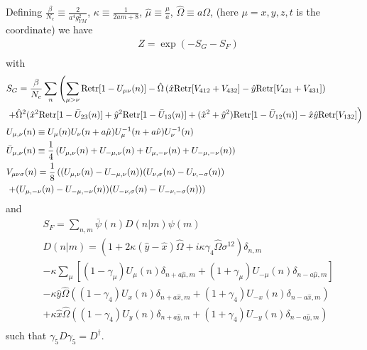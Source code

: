 Defining $\frac{\beta}{N_c} \equiv \frac{2}{a^4g_{YM}^2}$, $\kappa \equiv \frac{1}{2am+8}$, $\hat{\mu}\equiv \frac{\mu}{a}$, $\hat{\Omega}\equiv a\Omega$, (here $\mu=x,y,z,t$ is the coordinate) we have
\begin{equation}
\begin{split}
&Z=\exp (-S_G-S_F)\\
\end{split}
\end{equation}
with
\textcolor[rgb]{0,0,0.8}{
\begin{equation}
\begin{split}
&S_G=\frac{\beta}{N_c}\sum _{n}\left(\sum _{\mu >\nu}{\rm Retr}[1-U_{\mu\nu}(n)]-\hat{\Omega}\left(\hat{x}{\rm Retr}[V_{412}+V_{432}]-\hat{y}{\rm Retr}[V_{421}+V_{431}]\right)\right.\\
&\left.+\hat{\Omega}^2(\hat{x}^2{\rm Retr}[1-\bar{U}_{23}(n)]+\hat{y}^2{\rm Retr}[1-\bar{U}_{13}(n)]+(\hat{x}^2+\hat{y}^2){\rm Retr}[1-\bar{U}_{12}(n)]-\hat{x}\hat{y}{\rm Retr}[V_{132}]\right)\\
&U_{\mu, \nu}(n)\equiv U_{\mu}(n)U_{\nu}(n+a\hat{\mu})U^{-1}_{\mu}(n+a\hat{\nu})U^{-1}_{\nu}(n)\\
&\bar{U}_{\mu, \nu}(n)\equiv \frac{1}{4}\left(U_{\mu, \nu}(n)+U_{-\mu ,\nu}(n)+U_{\mu, -\nu}(n)+U_{-\mu, -\nu}(n)\right)\\
&V_{\mu\nu\sigma}(n)=\frac{1}{8}\left((U_{\mu,\nu}(n)-U_{-\mu,\nu}(n))(U_{\nu,\sigma}(n)-U_{\nu,-\sigma}(n))\right.\\
&\left.+(U_{\mu,-\nu}(n)-U_{-\mu,-\nu}(n))(U_{-\nu,\sigma}(n)-U_{-\nu,-\sigma}(n))\right)\\
\end{split}
\end{equation}
}
and
\textcolor[rgb]{0,0,0.8}{
\begin{equation}
\begin{split}
&S_F=\sum _{n,m}\bar{\psi }(n) D(n|m) \psi(m)\\
&D(n|m)=\left(1+2\kappa(\hat{y}-\hat{x})\hat{\Omega}+i\kappa \gamma _4 \hat{\Omega} \sigma ^{12}\right)\delta _{n,m}\\
&-\kappa\sum _{\mu}\left[(1-\gamma _{\mu})U_{\mu}(n)\delta _{n+a\hat{\mu},m}+(1+\gamma _{\mu})U_{-\mu}(n)\delta _{n-a\hat{\mu},m}\right]\\
&-\kappa \hat{y}\hat{\Omega} \left((1-\gamma _4)U_{x}(n)\delta _{n+a\hat{x},m}+(1+\gamma _4)U_{-x}(n)\delta _{n-a\hat{x},m}\right)\\
&+\kappa \hat{x}\hat{\Omega} \left((1-\gamma _4)U_{y}(n)\delta _{n+a\hat{y},m}+(1+\gamma _4)U_{-y}(n)\delta _{n-a\hat{y},m}\right)\\
\end{split}
\end{equation}
}
such that $\gamma _5 D \gamma _5=D^{\dagger}$.

